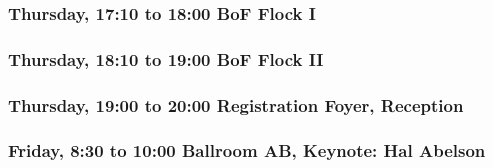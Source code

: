 \subsubsection*{Thursday, 17:10 to 18:00  BoF Flock I} 
\subsubsection*{Thursday, 18:10 to 19:00 BoF Flock II}
\subsubsection*{Thursday, 19:00 to 20:00 Registration Foyer, Reception}


\newpage

\subsubsection*{Friday, 8:30 to 10:00 Ballroom AB, Keynote: Hal Abelson}



